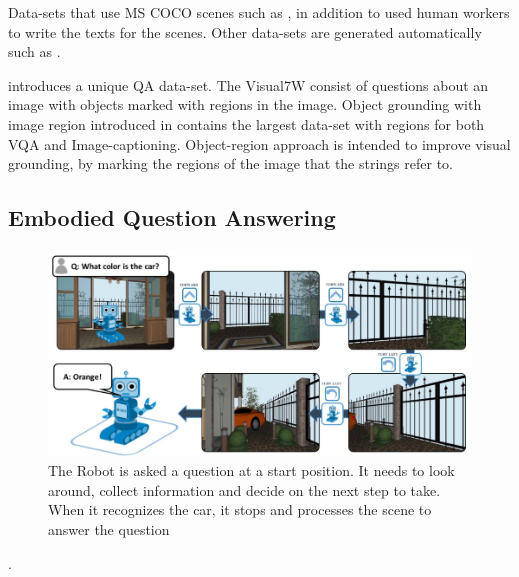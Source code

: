  Data-sets that use MS COCO scenes such as \cite{gao2015talking}, \cite{yu2015visual} in addition to \cite{VQA} used human workers to write the texts for the scenes. Other data-sets are generated automatically such as \cite{ren2015exploring}. 


\cite{zhu2016visual7w} introduces a  unique QA data-set. The Visual7W consist of questions about an image with objects marked with regions in the image. Object grounding with image region introduced in \cite{krishna2016visual} contains the largest data-set with regions for both VQA and Image-captioning. Object-region approach is intended to improve visual grounding, by marking the regions of the image that the strings refer to.



\subsection{Embodied Question Answering}

\begin{figure}[H]
\includegraphics[scale=0.4]{images/EmbodiedQuestionAnswering.png}
\caption{The Robot is asked a question at a start position. It needs to look around, collect information and decide on the next step to take. When it recognizes the car, it stops and processes the scene to answer the question }
\label{fig:EQA}
\end{figure}. 

